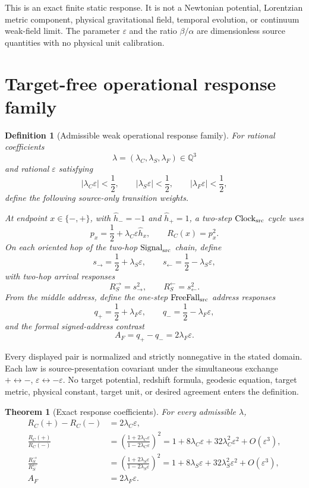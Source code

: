 \documentclass[11pt]{article}
\newtheorem{definition}{Definition}
\newtheorem{theorem}{Theorem}
\begin{document}
This is an exact finite static response.  It is not a Newtonian potential,
Lorentzian metric component, physical gravitational field, temporal evolution,
or continuum weak-field limit.  The parameter \(\varepsilon\) and the ratio
\(\beta/\alpha\) are dimensionless source quantities with no physical unit
calibration.

\section{Target-free operational response family}

\begin{definition}[Admissible weak operational response family]
For rational coefficients
\[
 \lambda=(\lambda_C,\lambda_S,\lambda_F)\in\mathbb Q^3
\]
and rational \(\varepsilon\) satisfying
\[
 |\lambda_C\varepsilon|<\frac12,\qquad
 |\lambda_S\varepsilon|<\frac12,\qquad
 |\lambda_F\varepsilon|<\frac12,
\]
define the following source-only transition weights.

At endpoint \(x\in\{-,+\}\), with
\(\widehat h_-=-1\) and \(\widehat h_+=1\), a two-step
\(\mathrm{Clock}_{\rm src}\) cycle uses
\[
 p_x=\frac12+\lambda_C\varepsilon\widehat h_x,
 \qquad
 R_C(x)=p_x^2.
\]
On each oriented hop of the two-hop
\(\mathrm{Signal}_{\rm src}\) chain, define
\[
 s_{\rightarrow}=\frac12+\lambda_S\varepsilon,\qquad
 s_{\leftarrow}=\frac12-\lambda_S\varepsilon,
\]
with two-hop arrival responses
\[
 R_S^\rightarrow=s_{\rightarrow}^2,\qquad
 R_S^\leftarrow=s_{\leftarrow}^2.
\]
From the middle address, define the one-step
\(\mathrm{FreeFall}_{\rm src}\) address responses
\[
 q_+=\frac12+\lambda_F\varepsilon,\qquad
 q_-=\frac12-\lambda_F\varepsilon,
\]
and the formal signed-address contrast
\[
 A_F=q_+-q_-=2\lambda_F\varepsilon.
\]
\end{definition}

Every displayed pair is normalized and strictly nonnegative in the stated
domain.  Each law is source-presentation covariant under the simultaneous
exchange \(+\leftrightarrow-\), \(\varepsilon\leftrightarrow-\varepsilon\).
No target potential, redshift formula, geodesic equation, target metric,
physical constant, target unit, or desired agreement enters the definition.

\begin{theorem}[Exact response coefficients]
\label{thm:responses}
For every admissible \(\lambda\),
\begin{align}
 R_C(+)-R_C(-)&=2\lambda_C\varepsilon,\\
 \frac{R_C(+)}{R_C(-)}
 &=\left(\frac{1+2\lambda_C\varepsilon}
              {1-2\lambda_C\varepsilon}\right)^2
 =1+8\lambda_C\varepsilon
   +32\lambda_C^2\varepsilon^2+O(\varepsilon^3),\\
 \frac{R_S^\rightarrow}{R_S^\leftarrow}
 &=\left(\frac{1+2\lambda_S\varepsilon}
              {1-2\lambda_S\varepsilon}\right)^2
 =1+8\lambda_S\varepsilon
   +32\lambda_S^2\varepsilon^2+O(\varepsilon^3),\\
 A_F&=2\lambda_F\varepsilon.
\end{align}
\end{theorem}
\end{document}
